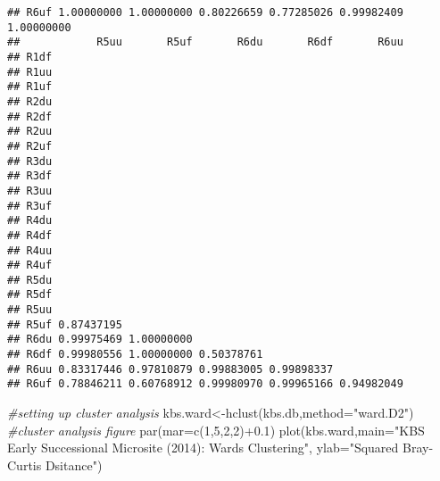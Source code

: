\documentclass[
]{article}
\newenvironment{Shaded}{\begin{snugshade}}{\end{snugshade}}
\newcommand{\AttributeTok}[1]{\textcolor[rgb]{0.77,0.63,0.00}{#1}}
\newcommand{\CommentTok}[1]{\textcolor[rgb]{0.56,0.35,0.01}{\textit{#1}}}
\newcommand{\DecValTok}[1]{\textcolor[rgb]{0.00,0.00,0.81}{#1}}
\newcommand{\FloatTok}[1]{\textcolor[rgb]{0.00,0.00,0.81}{#1}}
\newcommand{\FunctionTok}[1]{\textcolor[rgb]{0.00,0.00,0.00}{#1}}
\newcommand{\NormalTok}[1]{#1}
\newcommand{\OtherTok}[1]{\textcolor[rgb]{0.56,0.35,0.01}{#1}}
\newcommand{\SpecialCharTok}[1]{\textcolor[rgb]{0.00,0.00,0.00}{#1}}
\newcommand{\StringTok}[1]{\textcolor[rgb]{0.31,0.60,0.02}{#1}}
\begin{document}
\begin{verbatim}
## R6uf 1.00000000 1.00000000 0.80226659 0.77285026 0.99982409 1.00000000
##            R5uu       R5uf       R6du       R6df       R6uu
## R1df                                                       
## R1uu                                                       
## R1uf                                                       
## R2du                                                       
## R2df                                                       
## R2uu                                                       
## R2uf                                                       
## R3du                                                       
## R3df                                                       
## R3uu                                                       
## R3uf                                                       
## R4du                                                       
## R4df                                                       
## R4uu                                                       
## R4uf                                                       
## R5du                                                       
## R5df                                                       
## R5uu                                                       
## R5uf 0.87437195                                            
## R6du 0.99975469 1.00000000                                 
## R6df 0.99980556 1.00000000 0.50378761                      
## R6uu 0.83317446 0.97810879 0.99883005 0.99898337           
## R6uf 0.78846211 0.60768912 0.99980970 0.99965166 0.94982049
\end{verbatim}

\begin{Shaded}
\begin{Highlighting}[]
\CommentTok{\#setting up cluster analysis }
\NormalTok{kbs.ward}\OtherTok{\textless{}{-}}\FunctionTok{hclust}\NormalTok{(kbs.db,}\AttributeTok{method=}\StringTok{"ward.D2"}\NormalTok{)}
\CommentTok{\#cluster analysis figure}
\FunctionTok{par}\NormalTok{(}\AttributeTok{mar=}\FunctionTok{c}\NormalTok{(}\DecValTok{1}\NormalTok{,}\DecValTok{5}\NormalTok{,}\DecValTok{2}\NormalTok{,}\DecValTok{2}\NormalTok{)}\SpecialCharTok{+}\FloatTok{0.1}\NormalTok{)}
\FunctionTok{plot}\NormalTok{(kbs.ward,}\AttributeTok{main=}\StringTok{"KBS Early Successional Microsite (2014): Ward\textquotesingle{}s Clustering"}\NormalTok{,}
     \AttributeTok{ylab=}\StringTok{"Squared Bray{-}Curtis Dsitance"}\NormalTok{)}
\end{Highlighting}
\end{Shaded}
\end{document}

